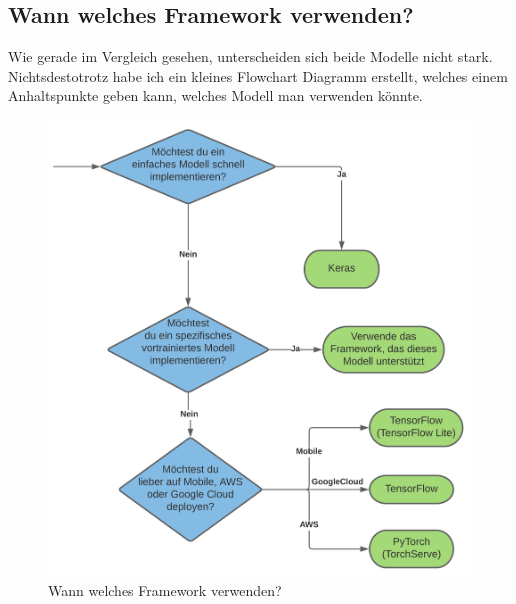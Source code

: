 \newpage

\subsection{Wann welches Framework verwenden?}

Wie gerade im Vergleich gesehen, unterscheiden sich beide Modelle nicht stark. Nichtsdestotrotz habe ich ein kleines Flowchart Diagramm erstellt, 
welches einem Anhaltspunkte geben kann, welches Modell man verwenden könnte. 

\begin{figure}[htbp]
    \centering
    \includegraphics[width=.9\textwidth]{figures/decision-tree}
    \caption{Wann welches Framework verwenden?}
    \label{fig:decision-tree}
\end{figure}